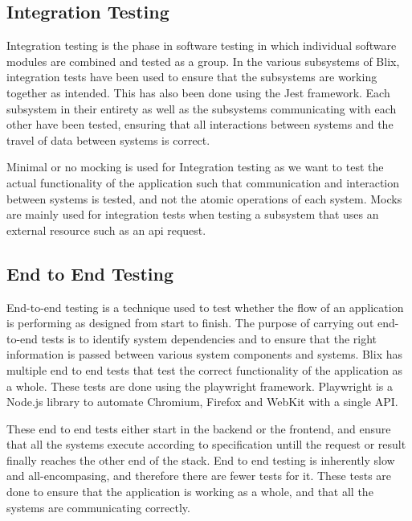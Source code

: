 \documentclass[11pt,a4paper]{article}
\begin{document}
\subsection*{Integration Testing}

Integration testing is the phase in software testing in which individual software modules are combined and tested as a group.
In the various subsystems of Blix, integration tests have been used to ensure that the subsystems are working together as intended. This has also been done using the Jest framework.
Each subsystem in their entirety as well as the subsystems communicating with each other have been tested, ensuring that all interactions between systems and the travel of data between systems is correct.

Minimal or no mocking is used for Integration testing as we want to test the actual functionality of the application such that communication and interaction between systems is tested, and
not the atomic operations of each system. Mocks are mainly used for integration tests when testing a subsystem that uses an external resource such as an api request. 

\subsection*{End to End Testing}

End-to-end testing is a technique used to test whether the flow of an application is performing as designed from start to finish. The purpose of carrying out end-to-end tests is to identify system dependencies and to ensure that the right information is passed between various system components and systems.
Blix has multiple end to end tests that test the correct functionality of the application as a whole. These tests are done using the playwright framework. Playwright is a Node.js library to automate Chromium, Firefox and WebKit with a single API. 

These end to end tests either start in the backend or the frontend, and ensure that all the systems execute according to specification untill the request or result finally reaches the other end of the stack.
End to end testing is inherently slow and all-encompasing, and therefore there are fewer tests for it. These tests are done to ensure that the application is working as a whole, and that all the systems are communicating correctly.
\end{document}
